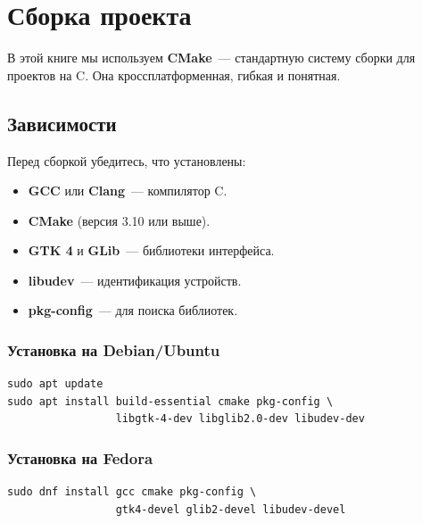 
\chapter{Сборка проекта}
\label{app:build}

В этой книге мы используем \textbf{CMake}~--- стандартную систему
сборки для проектов на C. Она кроссплатформенная, гибкая и понятная.

\section{Зависимости}

Перед сборкой убедитесь, что установлены:

\begin{itemize}
    \item \textbf{GCC} или \textbf{Clang}~--- компилятор C.
    \item \textbf{CMake} (версия 3.10 или выше).
    \item \textbf{GTK 4} и \textbf{GLib}~--- библиотеки интерфейса.
    \item \textbf{libudev}~--- идентификация устройств.
    \item \textbf{pkg-config}~--- для поиска библиотек.
\end{itemize}

\subsection{Установка на Debian/Ubuntu}

\begin{verbatim}
sudo apt update
sudo apt install build-essential cmake pkg-config \
                 libgtk-4-dev libglib2.0-dev libudev-dev
\end{verbatim}

\subsection{Установка на Fedora}

\begin{verbatim}
sudo dnf install gcc cmake pkg-config \
                 gtk4-devel glib2-devel libudev-devel
\end{verbatim}

